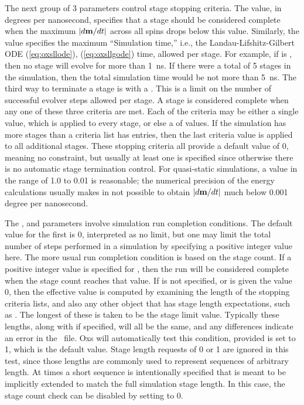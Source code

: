 \begin{description}
The next group of 3 parameters control stage stopping criteria.  The
 value, in degrees per nanosecond, specifies that a
stage should be considered complete when the maximum $|d\textbf{m}/dt|$ across
all spins drops below this value.  Similarly, the
 value specifies the maximum ``Simulation
time,'' i.e., the Landau-Lifshitz-Gilbert ODE (\ref{eq:oxsllode}),
(\ref{eq:oxsllgode}) time, allowed per stage.  For example, if
 is
, then no stage will evolve for more than
1~ns.  If there were a total of 5 stages in the simulation, then the
total simulation time would be not more than 5~ns.  The third way to
terminate a stage is with a .  This is
a limit on the number of successful evolver steps allowed per stage.  A
stage is considered complete when any one of these three criteria are
met.  Each of the criteria may be either a single value, which is
applied to every stage, or else a
 of values.  If the
simulation has more stages than a criteria list has entries, then the
last criteria value is applied to all additional stages.  These stopping
criteria all provide a default value of 0, meaning no constraint, but
usually at least one is specified since otherwise there is no automatic
stage termination control.  For quasi-static simulations, a
 value in the range of 1.0 to 0.01 is reasonable;
the numerical precision of the energy calculations usually makes in not
possible to obtain $|d\textbf{m}/dt|$ much below 0.001 degree per nanosecond.


\label{html:oxsdriverstagecount}
The ,  and
 parameters involve simulation run
completion conditions.  The default value for the first is 0,
interpreted as no limit, but one may limit the total number of steps
performed in a simulation by specifying a positive integer value here.
The more usual run completion condition is based on the stage count.  If
a positive integer value is specified for , then the
run will be considered complete when the stage count reaches that value.
If  is not specified, or is given the value 0, then the
effective  value is computed by examining the
length of the stopping criteria lists, and also any other 
object that has stage length expectations, such as
.  The longest of these is
taken to be the stage limit value.  Typically these lengths, along with
 if specified, will all be the same, and any
differences indicate an error in the \MIF\ file.  Oxs will automatically
test this condition, provided  is set to 1,
which is the default value.  Stage length requests of 0 or 1 are ignored
in this test, since those lengths are commonly used to represent
sequences of arbitrary length.  At times a short sequence is
intentionally specified that is meant to be implicitly extended to match
the full simulation stage length.  In this case, the stage count check
can be disabled by setting  to 0.


\end{description}
